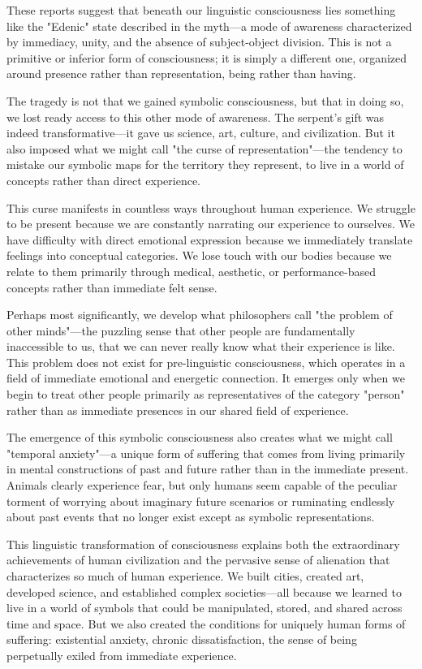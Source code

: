 These reports suggest that beneath our linguistic consciousness lies something like the "Edenic" state described in the myth—a mode of awareness characterized by immediacy, unity, and the absence of subject-object division. This is not a primitive or inferior form of consciousness; it is simply a different one, organized around presence rather than representation, being rather than having.

The tragedy is not that we gained symbolic consciousness, but that in doing so, we lost ready access to this other mode of awareness. The serpent's gift was indeed transformative—it gave us science, art, culture, and civilization. But it also imposed what we might call "the curse of representation"—the tendency to mistake our symbolic maps for the territory they represent, to live in a world of concepts rather than direct experience.

This curse manifests in countless ways throughout human experience. We struggle to be present because we are constantly narrating our experience to ourselves. We have difficulty with direct emotional expression because we immediately translate feelings into conceptual categories. We lose touch with our bodies because we relate to them primarily through medical, aesthetic, or performance-based concepts rather than immediate felt sense.

Perhaps most significantly, we develop what philosophers call "the problem of other minds"—the puzzling sense that other people are fundamentally inaccessible to us, that we can never really know what their experience is like. This problem does not exist for pre-linguistic consciousness, which operates in a field of immediate emotional and energetic connection. It emerges only when we begin to treat other people primarily as representatives of the category "person" rather than as immediate presences in our shared field of experience.

The emergence of this symbolic consciousness also creates what we might call "temporal anxiety"—a unique form of suffering that comes from living primarily in mental constructions of past and future rather than in the immediate present. Animals clearly experience fear, but only humans seem capable of the peculiar torment of worrying about imaginary future scenarios or ruminating endlessly about past events that no longer exist except as symbolic representations.

This linguistic transformation of consciousness explains both the extraordinary achievements of human civilization and the pervasive sense of alienation that characterizes so much of human experience. We built cities, created art, developed science, and established complex societies—all because we learned to live in a world of symbols that could be manipulated, stored, and shared across time and space. But we also created the conditions for uniquely human forms of suffering: existential anxiety, chronic dissatisfaction, the sense of being perpetually exiled from immediate experience.

